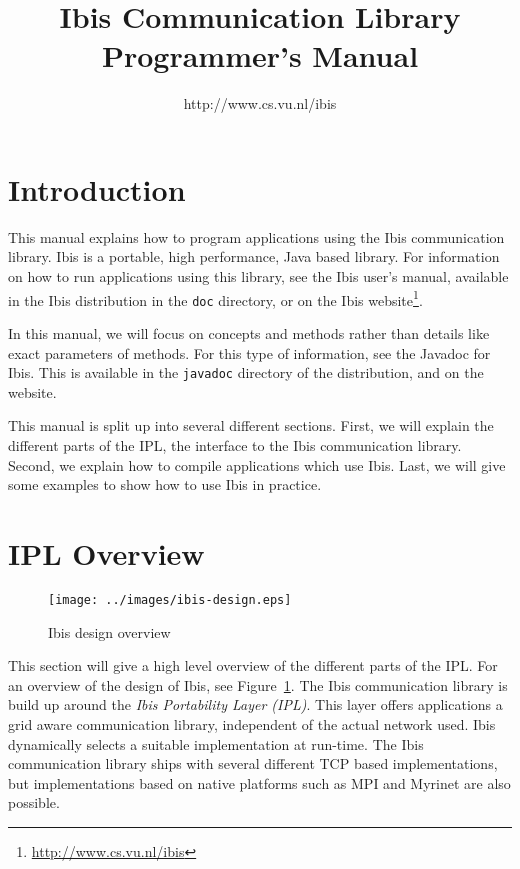 \documentclass[10pt]{article}
\begin{document}
\title{Ibis Communication Library Programmer's Manual}

\author{http://www.cs.vu.nl/ibis}

\maketitle

\section{Introduction}

This manual explains how to program applications using the Ibis
communication library. Ibis is a portable, high performance, Java based
library. For information on how to run applications using this library,
see the Ibis user's manual, available in the Ibis distribution in the
\texttt{doc} directory, or on the Ibis
website\footnote{\url{http://www.cs.vu.nl/ibis}}.

In this manual, we will focus on concepts and methods rather than
details like exact parameters of methods. For this type of
information, see the Javadoc for Ibis. This is available in the
\texttt{javadoc} directory of the distribution, and on the website.

This manual is split up into several different sections. First, we will
explain the different parts of the IPL, the interface to the Ibis
communication library. Second, we explain how to compile applications
which use Ibis. Last, we will give some examples 
to show how to use Ibis in practice.

\section{IPL Overview}


\begin{figure}[t] \centering
\texttt{[image: ../images/ibis-design.eps]}
\caption{Ibis design overview} \label{design}
\end{figure}

This section will give a high level overview of the different parts of
the IPL.  For an overview of the design of Ibis, see
Figure~\ref{design}. The Ibis communication library is build up around
the \emph{Ibis Portability Layer (IPL)}. This layer offers applications
a grid aware communication library, independent of the actual network
used. Ibis dynamically selects a suitable implementation at run-time.
The Ibis communication library ships with several different TCP based
implementations, but implementations based on native platforms such as
MPI and Myrinet are also possible.
\end{document}
